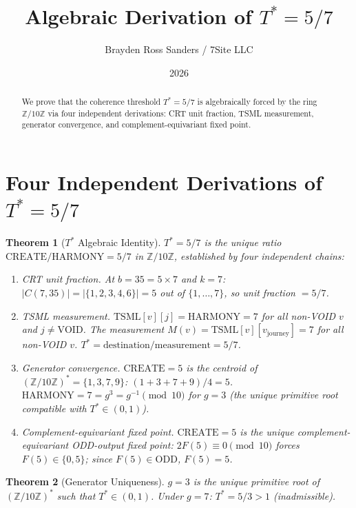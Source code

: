 \documentclass{amsart}
\title{Algebraic Derivation of $T^* = 5/7$}
\author{Brayden Ross Sanders / 7Site LLC}
\date{2026}
\newtheorem{theorem}{Theorem}
\begin{document}
\maketitle

\begin{abstract}
We prove that the coherence threshold $T^* = 5/7$ is algebraically forced by
the ring $\mathbb{Z}/10\mathbb{Z}$ via four independent derivations:
CRT unit fraction, TSML measurement, generator convergence,
and complement-equivariant fixed point.
\end{abstract}

\section{Four Independent Derivations of $T^* = 5/7$}

\begin{theorem}[$T^*$ Algebraic Identity]
$T^* = 5/7$ is the unique ratio $\mathrm{CREATE}/\mathrm{HARMONY} = 5/7$
in $\mathbb{Z}/10\mathbb{Z}$, established by four independent chains:

\begin{enumerate}
\item[\emph{(a)}] \emph{CRT unit fraction.} At $b=35=5\times7$ and $k=7$:
$|C(7,35)| = |\{1,2,3,4,6\}| = 5$ out of $\{1,\ldots,7\}$, so unit fraction $= 5/7$.

\item[\emph{(b)}] \emph{TSML measurement.} $\mathrm{TSML}[v][j] = \mathrm{HARMONY}=7$
for all non-VOID $v$ and $j \neq \mathrm{VOID}$.
The measurement $M(v) = \mathrm{TSML}[v][v_{\text{journey}}] = 7$ for all non-VOID $v$.
$T^* = \mathrm{destination}/\mathrm{measurement} = 5/7$.

\item[\emph{(c)}] \emph{Generator convergence.}
$\mathrm{CREATE}=5$ is the centroid of $(\mathbb{Z}/10\mathbb{Z})^* = \{1,3,7,9\}$:
$(1+3+7+9)/4 = 5$.
$\mathrm{HARMONY}=7 = g^3 = g^{-1} \pmod{10}$ for $g=3$
(the unique primitive root compatible with $T^* \in (0,1)$).

\item[\emph{(d)}] \emph{Complement-equivariant fixed point.}
$\mathrm{CREATE}=5$ is the unique complement-equivariant ODD-output fixed point:
$2F(5) \equiv 0 \pmod{10}$ forces $F(5) \in \{0,5\}$; since $F(5) \in \mathrm{ODD}$, $F(5)=5$.
\end{enumerate}
\end{theorem}

\begin{theorem}[Generator Uniqueness]
$g=3$ is the unique primitive root of $(\mathbb{Z}/10\mathbb{Z})^*$ such that $T^* \in (0,1)$.
Under $g=7$: $T^* = 5/3 > 1$ (inadmissible).
\end{theorem}
\end{document}
